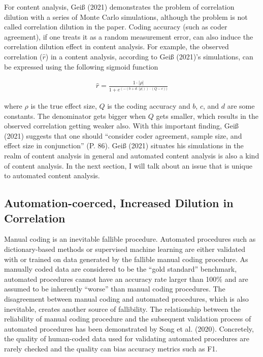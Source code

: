 \documentclass[english,man,floatsintext]{apa6}
\begin{document}
For content analysis, Geiß (2021) demonstrates the problem of correlation dilution with a series of Monte Carlo simulations, although the problem is not called correlation dilution in the paper. Coding accuracy (such as coder agreement), if one treats it as a random measurement error, can also induce the correlation dilution effect in content analysis. For example, the observed correlation (\(\hat{r}\)) in a content analysis, according to Geiß (2021)'s simulations, can be expressed using the following sigmoid function

\begin{align}
  \hat{r} = \frac{1 \cdot | \rho |}{1 + e^{(-(b+d \cdot | \rho |)) \cdot (Q - c))}}
\end{align}

where \(\rho\) is the true effect size, \(Q\) is the coding accuracy and \(b\), \(c\), and \(d\) are some constants. The denominator gets bigger when \(Q\) gets smaller, which results in the observed correlation getting weaker also. With this important finding, Geiß (2021) suggests that one should \enquote{consider coder agreement, sample size, and effect size in conjunction} (P. 86). Geiß (2021) situates his simulations in the realm of content analysis in general and automated content analysis is also a kind of content analysis. In the next section, I will talk about an issue that is unique to automated content analysis.

\hypertarget{automation-coerced-increased-dilution-in-correlation}{%
\subsection{Automation-coerced, Increased Dilution in Correlation}\label{automation-coerced-increased-dilution-in-correlation}}

Manual coding is an inevitable fallible procedure. Automated procedures such as dictionary-based methods or supervised machine learning are either validated with or trained on data generated by the fallible manual coding procedure. As manually coded data are considered to be the \enquote{gold standard} benchmark, automated procedures cannot have an accuracy rate larger than 100\% and are assumed to be inherently \enquote{worse} than manual coding procedures. The disagreement between manual coding and automated procedures, which is also inevitable, creates another source of fallibility. The relationship between the reliability of manual coding procedure and the subsequent validation process of automated procedures has been demonstrated by Song et al. (2020). Concretely, the quality of human-coded data used for validating automated procedures are rarely checked and the quality can bias accuracy metrics such as F1.
\end{document}
